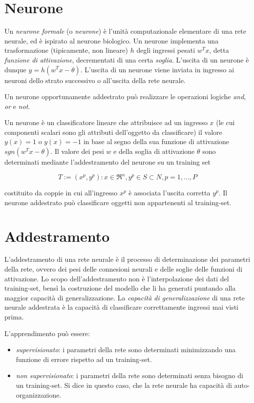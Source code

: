 \section{Neurone}
\label{sec:neural-networks.neuron}
Un \textit{neurone formale} (o \textit{neurone}) è l'unità computazionale elementare di una rete neurale, ed è ispirato al neurone biologico. Un neurone implementa una trasformazione (tipicamente, non lineare) $h$ degli ingressi pesati $w^
{T}x$, detta \textit{funzione di attivazione}, decrementati di una certa \textit{soglia}. L'uscita di un neurone è dunque $y=h(w^{T}x-\theta)$. L'uscita di un neurone viene inviata in ingresso ai neuroni dello strato successivo o all'uscita della rete neurale.

Un neurone opportunamente addestrato può realizzare le operazioni logiche \textit{and}, \textit{or} e \textit{not}.

Un neurone è un classificatore lineare che attribuisce ad un ingresso $x$ (le cui componenti scalari sono gli attributi dell'oggetto da classificare) il valore $y(x)=1$ o $y(x)=-1$ in base al segno della sua funzione di attivazione $sgn(w^{T}x-\theta)$. Il valore dei pesi $w$ e della soglia di attivazione $\theta$ sono determinati mediante l'addestramento del neurone su un training set

\begin{equation}
  \label{eqn:neural-networks.neuron.training-set}
  T:={(x^p,y^p): x\in\Re^{n},y^{p}\in S\subset N, p=1,...,P}
\end{equation}

costituito da coppie in cui all'ingresso $x^{p}$ è associata l'uscita corretta $y^{p}$.
Il neurone addestrato può classificare oggetti non appartenenti al training-set.


\section{Addestramento}
\label{sec:learning}
L'addestramento di una rete neurale è il processo di determinazione dei parametri della rete, ovvero dei pesi delle connesioni neurali e delle soglie delle funzioni di attivazione.
Lo scopo dell'addestramento non è l'interpolazione dei dati del training-set, bensì la costruzione del modello che li ha generati puntando alla maggior capacità di generalizzazione.
La \textit{capacità di generalizzazione} di una rete neurale addestrata è la capacità di classificare correttamente ingressi mai visti prima.

L'apprendimento può essere:

\begin{itemize}
  \item \textit{supervisionato}: i parametri della rete sono determinati minimizzando una funzione di errore rispetto ad un training-set.
  \item \textit{non supervisionato}: i parametri della rete sono determinati senza bisogno di un training-set. Si dice in questo caso, che la rete neurale ha capacità di auto-organizzazione.
\end{itemize}
